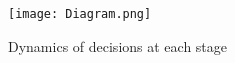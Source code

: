 \documentclass[10pt]{article}
\begin{document}

\begin{figure}[!h]
\begin{center}
\texttt{[image: Diagram.png]}
\caption{Dynamics of decisions at each stage} 
\label{MultistageDynamics}
\end{center}
\end{figure}



\end{document}
